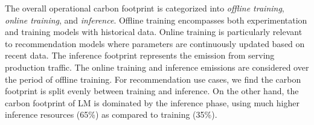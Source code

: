 \vspace{+0.2cm}
\vspace{+0.2cm}

The overall operational carbon footprint is categorized into \textit{offline training}, \textit{online training}, and \textit{inference}. 
Offline training encompasses both experimentation and training models with historical data.
Online training is particularly relevant to recommendation models where parameters are continuously updated based on recent data.
The inference footprint represents the emission from serving production traffic.
The online training and inference emissions are considered over the period of offline training.
 For recommendation use cases, we find the carbon footprint is split evenly between training and inference. On the other hand, the carbon footprint of LM is dominated by the inference phase, using much higher inference resources (65\%) as compared to training (35\%).



 

